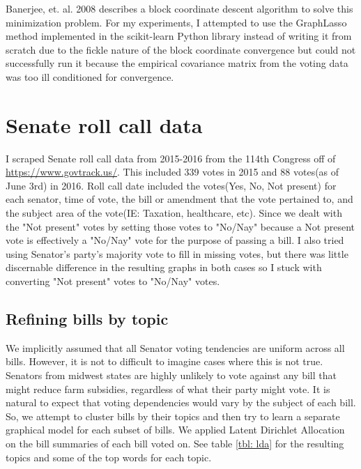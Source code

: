 \documentclass{article}
\begin{document}
Banerjee, et. al. 2008 describes a block coordinate descent algorithm to solve this minimization problem. For my experiments, I attempted to use the GraphLasso method implemented in the scikit-learn Python library instead of writing it from scratch due to the fickle nature of the block coordinate convergence but could not successfully run it because the empirical covariance matrix from the voting data was too ill conditioned for convergence.

\section{Senate roll call data}
I scraped Senate roll call data from 2015-2016 from the 114th Congress off of \href{https://www.govtrack.us/}{https://www.govtrack.us/}. This included 339 votes
in 2015 and 88 votes(as of June 3rd) in 2016. Roll call date included the votes(Yes, No, Not present) for each senator, time of vote, the bill or amendment that
the vote pertained to, and the subject area of the vote(IE: Taxation, healthcare, etc).
Since we dealt with the "Not present" votes by setting those votes to "No/Nay" because a Not present vote is effectively a "No/Nay" vote for the purpose of passing a bill. I also tried using Senator's party's majority vote to fill in missing votes, but there was little discernable difference in the resulting graphs in both cases so I stuck with converting "Not present" votes to "No/Nay" votes.

\subsection{Refining bills by topic}
We implicitly assumed that all Senator voting tendencies are uniform across all bills. However, it is not to difficult to imagine cases where this is not true. Senators from midwest states are
highly unlikely to vote against any bill that might reduce farm subsidies, regardless of what their party might vote.
It is natural to expect that voting dependencies would vary by the subject of each bill. So, we attempt to cluster bills by their topics and then try to learn a separate graphical model for each subset of bills. We applied Latent Dirichlet Allocation on the bill summaries of each bill voted on. See table \ref{tbl: lda} for the resulting topics and some of the top words for each topic.
\end{document}
